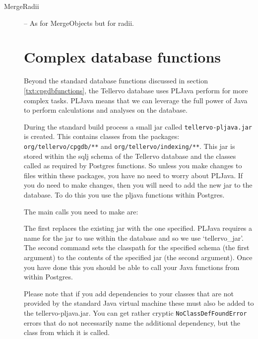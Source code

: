 \begin{description}
 \item[MergeRadii] -- As for MergeObjects but for radii.



\section{Complex database functions}
Beyond the standard database functions discussed in section \ref{txt:cpgdbfunctions}, the Tellervo database uses PLJava perform for more complex tasks.  PLJava means that we can leverage the full power of Java to perform calculations and analyses on the database.  

During the standard build process a small jar called \verb|tellervo-pljava.jar| is created.  This contains classes from the packages: \verb|org/tellervo/cpgdb/**| and \verb |org/tellervo/indexing/**|.  This jar is stored within the sqlj schema of the Tellervo database and the classes called as required by Postgres functions.  So unless you make changes to files within these packages, you have no need to worry about PLJava.  If you do need to make changes, then you will need to add the new jar to the database.  To do this you use the pljava functions within Postgres.  

The main calls you need to make are: 
 
The first replaces the existing jar with the one specified.  PLJava requires a name for the jar to use within the database and so we use `tellervo\_jar'.  The second command sets the classpath for the specified schema (the first argument) to the contents of the specified jar (the second argument).  Once you have done this you should be able to call your Java functions from within Postgres.

Please note that if you add dependencies to your classes that are not provided by the standard Java virtual machine these must also be added to the tellervo-pljava.jar.  You can get rather cryptic \verb|NoClassDefFoundError| errors that do not necessarily name the additional dependency, but the class from which it is called.



\end{description}